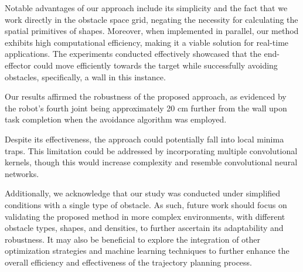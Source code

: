 \documentclass[a4paper]{article}
\begin{document}
Notable advantages of our approach include its simplicity and the fact that we work directly in the obstacle space grid, negating the necessity for calculating the spatial primitives of shapes. Moreover, when implemented in parallel, our method exhibits high computational efficiency, making it a viable solution for real-time applications. The experiments conducted effectively showcased that the end-effector could move efficiently towards the target while successfully avoiding obstacles, specifically, a wall in this instance.

Our results affirmed the robustness of the proposed approach, as evidenced by the robot's fourth joint being approximately 20 cm further from the wall upon task completion when the avoidance algorithm was employed.

Despite its effectiveness, the approach could potentially fall into local minima traps. This limitation could be addressed by incorporating multiple convolutional kernels, though this would increase complexity and resemble convolutional neural networks.

Additionally, we acknowledge that our study was conducted under simplified conditions with a single type of obstacle. As such, future work should focus on validating the proposed method in more complex environments, with different obstacle types, shapes, and densities, to further ascertain its adaptability and robustness. It may also be beneficial to explore the integration of other optimization strategies and machine learning techniques to further enhance the overall efficiency and effectiveness of the trajectory planning process.
\end{document}
